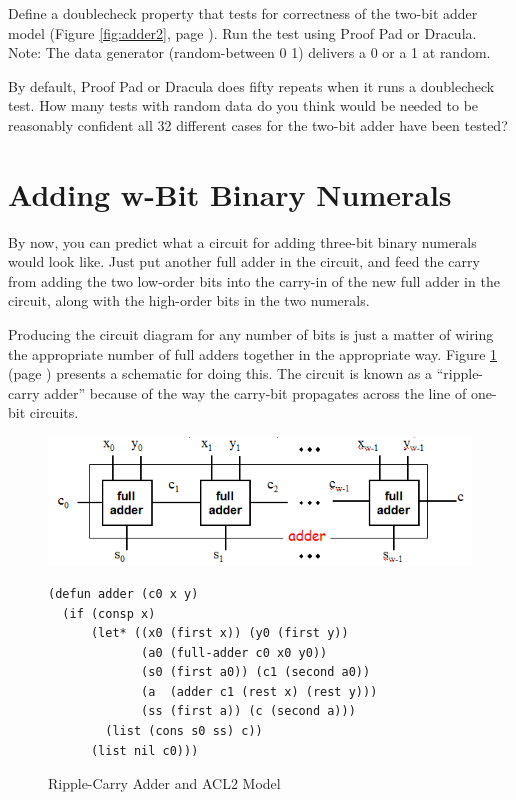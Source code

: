 \begin{ExerciseList}
\Exercise Define a doublecheck property that tests
for correctness of the two-bit adder model
(Figure \ref{fig:adder2}, page \pageref{fig:adder2}).
Run the test using Proof Pad or Dracula.
Note: The data generator (random-between 0 1) delivers
a 0 or a 1 at random.

\Exercise By default, Proof Pad or Dracula does fifty repeats
when it runs a doublecheck test.
How many tests with random data do you think would be needed to be reasonably
confident all 32 different cases for the two-bit adder have been tested?
\end{ExerciseList}

\section{Adding w-Bit Binary Numerals}
\label{sec:adding-w-bit-numerals}

By now, you can predict what a circuit for adding three-bit
binary numerals would look like.
Just put another full adder in the circuit, and feed the
carry from adding the two low-order bits into the carry-in
of the new full adder in the circuit, along with
the high-order bits in the two numerals.

Producing the circuit diagram for any number of bits
is just a matter of wiring the appropriate number of
full adders together in the appropriate way.
Figure \ref{fig:adder} (page \pageref{fig:adder}) presents a schematic for doing this.
The circuit is known as a ``ripple-carry adder'' because
of the way the carry-bit propagates across the line
of one-bit circuits.

\begin{figure}
\begin{center}
\includegraphics[scale=0.9]{Images/adder.png}
\begin{Verbatim}
(defun adder (c0 x y)
  (if (consp x)
      (let* ((x0 (first x)) (y0 (first y))
             (a0 (full-adder c0 x0 y0))
             (s0 (first a0)) (c1 (second a0))
             (a  (adder c1 (rest x) (rest y)))
             (ss (first a)) (c (second a)))
        (list (cons s0 ss) c))
      (list nil c0)))
\end{Verbatim}
\end{center}
\caption{Ripple-Carry Adder and ACL2 Model}
\label{fig:adder}
\end{figure}

